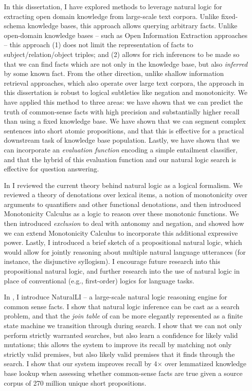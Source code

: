 In this dissertation, I have explored methods to leverage natural logic for extracting
  open domain knowledge from large-scale text corpora.
Unlike fixed-schema knowledge bases, this approach allows querying arbitrary facts.
Unlike open-domain knowledge bases -- such as Open Information Extraction approaches --
  this approach (1) does not limit the representation of facts to subject/relation/object
  triples; and (2) allows for rich inferences to be made so that we can find facts
  which are not only in the knowledge base, but also \textit{inferred} by some known
  fact.
From the other direction, unlike shallow information retrieval approaches, which also
  operate over large text corpora, the approach in this dissertation is robust to
  logical subtleties like negation and monotonicity.
We have applied this method to three areas: we have shown that we can predict the truth
  of common-sense facts with high precision and substantially higher recall than using
  a fixed knowledge base.
We have shown that we can segment complex sentences into short atomic propositions, and that
  this is effective for a practical downstream task of knowledge base population.
Lastly, we have shown that we can incorporate an \textit{evaluation function} encoding a
  simple entailment classifier, and that the hybrid of this evaluation function and
  our natural logic search is effective for question answering.

In  I reviewed the current theory behind natural logic as a logical formalism.
We reviewed a theory of denotations over lexical items, a notion of monotonicity over arguments
  to quantifiers and other functional denotations, and then introduced Monotonicity Calculus
  as a logic to reason over these monotonic functions.
We then introduced \textit{exclusion} to deal with antonomy and negation, and showed how we
  can extend Monotonicity Calculus to incorporate this additional expressive power.
Lastly, I introduced a brief sketch of a propositional natural logic, which would allow for
  jointly reasoning about multiple natural language utterances (for instance, the disjunctive
  syllogism).
I encourage future research into this propositional natural logic, and further research into
  the use of natural logic in place of conventional (e.g., first-order) logics for language
  tasks.

In , I introduce NaturalLI -- a large-scale natural logic reasoning engine
  for common sense facts.
I show that natural logic inference can be cast as a search problem, and that the \textit{join table}
  of  can be more elegantly represented as a finite state
  machine we transition through during search.
I show that we can not only perform strictly warranted searches, but also learn a confidence for
  likely valid mutations; this allows the system to improve its recall by matching not only
  strictly valid premises, but also likely valid premises that it finds through the search.
I show that our system improves recall by 4$\times$ over lemmatized knowledge base lookup when
  assessing whether common-sense facts are true given a source corpus of 270 million unique
  short propositions.

